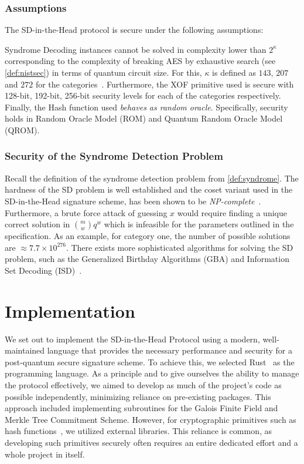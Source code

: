 \documentclass[11pt]{report}
\theoremstyle{definition}
\theoremstyle{plain}
\begin{document}
\subsection{Assumptions}\label{sec:assumptions}
The SD-in-the-Head protocol is secure under the following assumptions:

Syndrome Decoding instances cannot be solved in complexity lower than $2^\kappa$ corresponding to the complexity of breaking AES by exhaustive search (see \autoref{def:nistsec}) in terms of quantum circuit size. For this, $\kappa$ is defined as $143$, $207$ and $272$ for the categories~\cite{nistcall}. Furthermore, the XOF primitive used is secure with 128-bit, 192-bit, 256-bit security levels for each of the categories respectively. Finally, the Hash function used \textit{behaves as random oracle}. Specifically, security holds in Random Oracle Model (ROM) and Quantum Random Oracle Model (QROM).

\subsection{Security of the Syndrome Detection Problem}\label{sec:sdsec}

Recall the definition of the syndrome detection problem from \autoref{def:syndrome}. The hardness of the SD problem is well established and the coset variant used in the SD-in-the-Head signature scheme, has been shown to be \textit{NP-complete}~\cite{berlekamp1978inherent,aguilarsyndrome11}. Furthermore, a brute force attack of guessing $x$ would require finding a unique correct solution in $\binom{m}{w} q^w$ which is infeasible for the parameters outlined in the specification. As an example, for category one, the number of possible solutions are $\approx 7.7 \times 10^{276}$. There exists more sophisticated algorithms for solving the SD problem, such as the Generalized Birthday Algorithms (GBA) and Information Set Decoding (ISD)~\cite{prange1962use}.



\chapter{Implementation}\label{ch:impl}

We set out to implement the SD-in-the-Head Protocol using a modern, well-maintained language that provides the necessary performance and security for a post-quantum secure signature scheme. To achieve this, we selected Rust~\cite{rustlangRustProgramming,nistsaferlanguages,lurklurkEffectiveRust,rustlangPerformanceBook} as the programming language. As a principle and to give ourselves the ability to manage the protocol effectively, we aimed to develop as much of the project's code as possible independently, minimizing reliance on pre-existing packages. This approach included implementing subroutines for the Galois Finite Field and Merkle Tree Commitment Scheme. However, for cryptographic primitives such as hash functions~\cite{blakethree,tinykeccak}, we utilized external libraries. This reliance is common, as developing such primitives securely often requires an entire dedicated effort and a whole project in itself.
\end{document}
